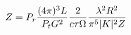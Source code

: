 \documentclass[preview]{standalone}
\begin{document}
\begin{align*}
\special{dvisvgm:raw <g id='unique000'>}Z = P_r \frac{(4 \pi)^3 L}{P_t G^2} \frac{2}{c \tau \Omega} \frac{\lambda^2 R^2}{\pi^5 |K|^2 Z}\special{dvisvgm:raw </g>}
\end{align*}
\end{document}
